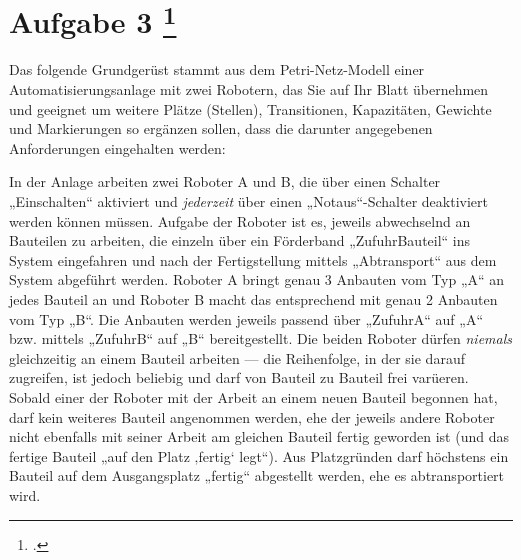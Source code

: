 \documentclass{lehramt-informatik-aufgabe}
\begin{document}
\section{Aufgabe 3
\footcite{66116:2015:03}}

Das folgende Grundgerüst stammt aus dem Petri-Netz-Modell einer
Automatisierungsanlage mit zwei Robotern, das Sie auf Ihr Blatt
übernehmen und geeignet um weitere Plätze (Stellen), Transitionen,
Kapazitäten, Gewichte und Markierungen so ergänzen sollen, dass die
darunter angegebenen Anforderungen eingehalten werden:

In der Anlage arbeiten zwei Roboter A und B, die über einen Schalter
„Einschalten“ aktiviert und \emph{jederzeit} über einen
„Notaus“-Schalter deaktiviert werden können müssen. Aufgabe der Roboter ist es,
jeweils abwechselnd an Bauteilen zu arbeiten, die einzeln über ein
Förderband „ZufuhrBauteil“ ins System eingefahren und nach der
Fertigstellung mittels „Abtransport“ aus dem System abgeführt werden.
Roboter A bringt genau 3 Anbauten vom Typ „A“ an jedes Bauteil an und
Roboter B macht das entsprechend mit genau 2 Anbauten vom Typ „B“. Die
Anbauten werden jeweils passend über „ZufuhrA“ auf „A“ bzw. mittels
„ZufuhrB“ auf „B“ bereitgestellt. Die beiden Roboter dürfen
\emph{niemals} gleichzeitig an einem Bauteil arbeiten — die Reihenfolge,
in der sie darauf zugreifen, ist jedoch beliebig und darf von Bauteil zu
Bauteil frei varüeren. Sobald einer der Roboter mit der Arbeit an einem
neuen Bauteil begonnen hat, darf kein weiteres Bauteil angenommen
werden, ehe der jeweils andere Roboter nicht ebenfalls mit seiner Arbeit
am gleichen Bauteil fertig geworden ist (und das fertige Bauteil „auf
den Platz ‚fertig‘ legt“). Aus Platzgründen darf höchstens ein Bauteil
auf dem Ausgangsplatz „fertig“ abgestellt werden, ehe es abtransportiert
wird.
\end{document}
